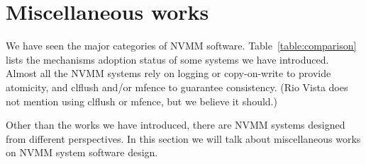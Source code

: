 \section{Miscellaneous works} 
\label{sec:related}

\begin{table}
	\vspace*{1mm}
	\caption{}
	\label{table:comparison}
\end{table}

We have seen the major categories of NVMM software.
Table~\ref{table:comparison} lists the mechanisms adoption status of some
systems we have introduced. Almost all the NVMM systems rely on logging or
copy-on-write to provide atomicity, and clflush and/or mfence to guarantee
consistency. (Rio Vista does not mention using clflush or mfence, but we believe
it should.)

Other than the works we have introduced, there are NVMM systems designed from
different perspectives. In this section we will talk about miscellaneous works
on NVMM system software design.


